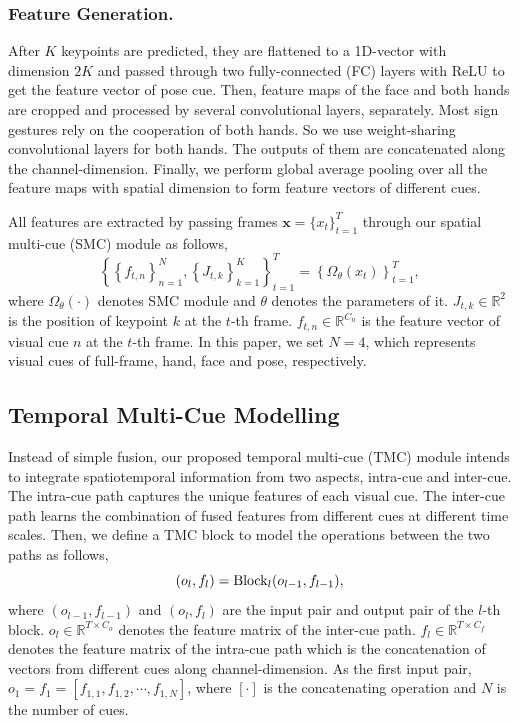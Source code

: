 \documentclass[letterpaper]{article} %
\begin{document}
\subsubsection{Feature Generation.}
After $K$ keypoints are predicted, they are flattened to a 1D-vector with dimension $2K$ and passed through two fully-connected (FC) layers with ReLU to get the feature vector of pose cue. Then, feature maps of the face and both hands are cropped and processed by several convolutional layers, separately. Most sign gestures rely on the cooperation of both hands. So we use weight-sharing convolutional layers for both hands. The outputs of them are concatenated along the channel-dimension. Finally, we perform global average pooling over all the feature maps with spatial dimension to form feature vectors of different cues.

All features are extracted by passing frames $\mathbf{x}=\{x_t\}_{t=1}^T$ through our spatial multi-cue (SMC) module as follows,
\begin{equation} \label{eq:smc}
    \left\{ \left\{f_{t,n}\right\}_{n=1}^N , \left\{J_{t,k}\right\}_{k=1}^K \right\}_{t=1}^T = \left\{ \Omega_\theta(x_t) \right\}_{t=1}^T,
\end{equation}
where \(\Omega_\theta(\cdot)\) denotes SMC module and $\theta$ denotes the parameters of it. $J_{t,k}\in\mathbb{R}^2$ is the position of keypoint $k$ at the $t$-th frame. $f_{t,n}\in\mathbb{R}^{C_n}$ is the feature vector of visual cue $n$ at the $t$-th frame. In this paper, we set $N=4$, which represents visual cues of full-frame, hand, face and pose, respectively.


\subsection{Temporal Multi-Cue Modelling}
Instead of simple fusion, our proposed temporal multi-cue (TMC) module intends to integrate spatiotemporal information from two aspects, intra-cue and inter-cue. The intra-cue path captures the unique features of each visual cue. The inter-cue path learns the combination of fused features from different cues at different time scales. Then, we define a TMC block to model the operations between the two paths as follows,
\begin{equation}
    ({o_l,f_l}) = {\rm Block}_l({o_{l-1}, f_{l-1}}),
\end{equation}
where $(o_{l-1},f_{l-1})$ and $(o_l,f_l)$ are the input pair and output pair of the $l$-th block.
$o_l\in\mathbb{R}^{T\times C_o}$ denotes the feature matrix of the inter-cue path.
$f_l\in\mathbb{R}^{T\times C_f}$ denotes the feature matrix of the intra-cue path which is the concatenation of vectors from different cues along channel-dimension.
As the first input pair, $o_1\!=\!f_1\!=\![f_{1,1}, f_{1,2}, \cdots, f_{1,N}]$, where $[\cdot]$ is the concatenating operation and $N$ is the number of cues.
\end{document}
